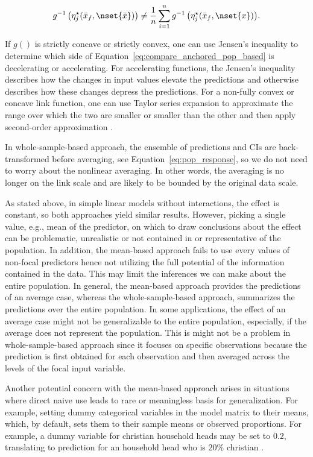 \begin{align}\label{eq:compare_anchored_pop_based}
g^{-1} \left(\eta_j^\star(\bar{x}_f, \nset{\bar{x}})\right) \neq \frac{1}{n} \sum_{i=1}^n{ g^{-1} \left(\eta_j^\star(\bar{x}_f, \nset{x})\right)}.
\end{align}

If $g()$ is strictly concave or strictly convex, one can use Jensen's inequality to determine which side of Equation~\ref{eq:compare_anchored_pop_based} is decelerating or accelerating. For accelerating functions, the Jensen’s inequality describes how the changes in input values elevate the predictions and otherwise describes how these changes depress the predictions. For a non-fully convex or concave link function, one can use Taylor series expansion to approximate the range over which the two are smaller or smaller than the other and then apply second-order approximation \citep{hanmer2013behind}.

In whole-sample-based approach, the ensemble of predictions and CIs are back-transformed before averaging, see Equation~\ref{eq:pop_response}, so we do not need to worry about the nonlinear averaging. In other words, the averaging is no longer on the link scale and are likely to be bounded by the original data scale.

As stated above, in simple linear models without interactions, the effect is constant, so both approaches yield similar results. However, picking a single value, e.g., mean of the predictor, on which to draw conclusions about the effect can be problematic, unrealistic or not contained in or representative of the population. In addition, the mean-based approach fails to use every values of non-focal predictors hence not utilizing the full potential of the information contained in the data. This may limit the inferences we can make about the entire population. In general, the mean-based approach provides the predictions of an average case, whereas the whole-sample-based approach, summarizes the predictions over the entire population. In some applications, the effect of an average case might not be generalizable to the entire population, especially, if the average does not represent the population. This is might not be a problem in whole-sample-based approach since it focuses on specific observations because the prediction is first obtained for each observation and then averaged across the levels of the focal input variable.


Another potential concern with the mean-based approach arises in situations where direct naive use leads to rare or meaningless basis for generalization. For example, setting dummy categorical variables in the model matrix to their means, which, by default, sets them to their sample means or observed proportions. For example, a dummy variable for christian household heads may be set to $0.2$, translating to prediction for an household head who is $20\%$ christian \citep{hanmer2013behind}.

